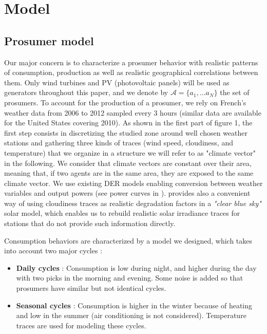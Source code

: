 \documentclass[conference]{IEEEtran}
\begin{document}
\section{Model}
\label{sec:model}
\subsection{Prosumer model}\label{subsec:ProsumerModel}

Our major concern is to characterize a prosumer behavior with realistic patterns of consumption, production as well as realistic geographical correlations between them. Only wind turbines and PV (photovoltaic panels) will be used as generators throughout this paper, and we denote by $ \mathcal{A} = \{ a_{1},...a_{N} \} $ the set of prosumers. To account for the production of a prosumer, we rely on French's weather data from 2006 to 2012 sampled every 3 hours \cite{Infoclimat} (similar data are available for the United States covering 2010\cite{NCDC}). As shown in the first part of figure 1, the first step consists in discretizing the studied zone around well chosen weather stations and gathering three kinds of traces (wind speed, cloudiness, and temperature) that we organize in a structure we will refer to as "climate vector" in the following. We consider that climate vectors are constant over their area, meaning that, if two agents are in the same area, they are exposed to the same climate vector. We use existing DER models enabling conversion between weather variables and output powers (see power curves in \cite{Kota2011} \cite{windturbinemodel}). \cite{Dans2007} provides also a convenient way of using cloudiness traces as realistic degradation factors in a \textit{"clear blue sky"} solar model, which enables us to rebuild realistic solar irradiance traces for stations that do not provide such information directly.

Consumption behaviors are characterized by a model we designed, which takes into account two major cycles : 

\begin{itemize}
\item \textbf{Daily cycles} : Consumption is low during night, and higher during the day with two picks in the morning and evening. Some noise is added so that prosumers have similar but not identical cycles.
\item \textbf{Seasonal cycles} : Consumption is higher in the winter because of heating and low in the summer (air conditioning is not considered). Temperature traces are used for modeling these cycles.
\end{itemize} 
\end{document}
